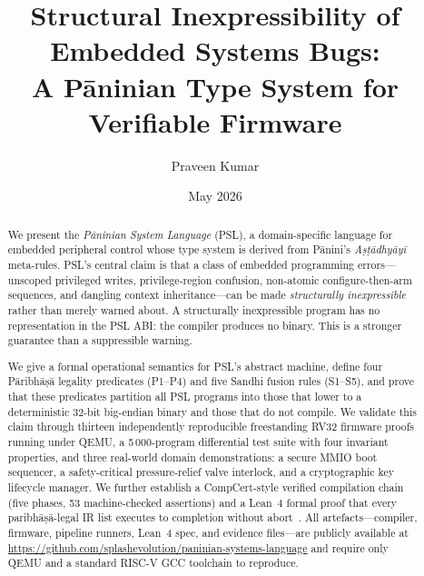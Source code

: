 \documentclass[11pt,a4paper]{article}
\begin{document}
\title{Structural Inexpressibility of Embedded Systems Bugs:\\
       A P\={a}ninian Type System for Verifiable Firmware}

\author[1]{Praveen Kumar}

\date{May 2026}

\maketitle

\begin{abstract}
We present the \emph{P\={a}ninian System Language} (PSL), a domain-specific
language for embedded peripheral control whose type system is derived from
P\={a}nini's \emph{A\d{s}\d{t}\={a}dhy\={a}y\={i}} meta-rules. PSL's central
claim is that a class of embedded programming errors---unscoped privileged
writes, privilege-region confusion, non-atomic configure-then-arm sequences,
and dangling context inheritance---can be made \emph{structurally
inexpressible} rather than merely warned about. A structurally inexpressible
program has no representation in the PSL ABI: the compiler produces no binary.
This is a stronger guarantee than a suppressible warning.

We give a formal operational semantics for PSL's abstract machine, define
four P\={a}ribh\={a}\d{s}\={a} legality predicates (P1--P4) and five Sandhi
fusion rules (S1--S5), and prove that these predicates partition all PSL
programs into those that lower to a deterministic 32-bit big-endian binary
and those that do not compile. We validate this claim through thirteen
independently reproducible freestanding RV32 firmware proofs running under
QEMU, a 5\,000-program differential test suite with four invariant properties,
and three real-world domain demonstrations: a secure MMIO boot sequencer, a
safety-critical pressure-relief valve interlock, and a cryptographic key
lifecycle manager. We further establish a CompCert-style verified compilation
chain (five phases, 53 machine-checked assertions) and a Lean~4 formal proof
that every paribh\={a}\d{s}\={a}-legal IR list executes to completion without
abort~\cite{moura2021lean4,leroy2009compcert}. All artefacts---compiler,
firmware, pipeline runners, Lean~4 spec, and evidence files---are publicly
available at \url{https://github.com/splashevolution/paninian-systems-language}
and require only QEMU and a standard RISC-V GCC toolchain to reproduce.
\end{abstract}
\end{document}
